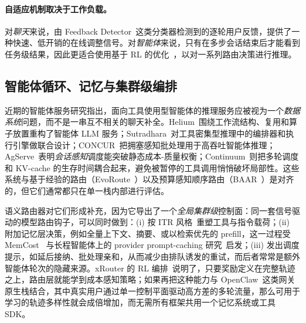 \paragraph{自适应机制取决于工作负载。}
对\emph{聊天}来说，由 Feedback Detector~\cite{feedbackdet2026}这类分类器检测到的逐轮用户反馈，提供了一种快速、低开销的在线调整信号。对\emph{智能体}来说，只有在多步会话结束后才能看到任务级结果，因此更适合使用基于 RL 的优化~\cite{routerr1_2025}，以对一系列路由决策进行推理。

\subsection{智能体循环、记忆与集群级编排}
\label{sec:router:agent-loops}

近期的智能体服务研究指出，面向工具使用型智能体的推理服务应被视为一个\emph{数据系统}问题，而不是一串互不相关的聊天补全。Helium~\cite{helium2026}围绕工作流结构、复用和算子放置重构了智能体 LLM 服务；Sutradhara~\cite{sutradhara2026}对工具密集型推理中的编排器和执行引擎做联合设计；CONCUR~\cite{concur2026}把拥塞感知批处理用于高吞吐智能体推理；AgServe~\cite{agserve2025}表明\emph{会话感知}调度能突破静态成本-质量权衡；Continuum~\cite{continuum2025}则把多轮调度和 KV-cache 的生存时间耦合起来，避免被暂停的工具调用悄悄破坏局部性。这些系统与基于经验的路由（EvoRoute~\cite{evoroute2026}）以及预算感知顺序路由（BAAR~\cite{baar2026}）是对齐的，但它们通常都只在单一栈内部进行评估。

语义路由器对它们形成补充，因为它导出了一个\emph{全局集群级}控制面：同一套信号驱动的模型路由钩子，可以同时做到：(i) 按 ITR 风格~\cite{itr2026}重塑工具与指令载荷；(ii) 附加记忆层决策，例如全量上下文、摘要、或以检索优先的 prefill，这一过程受 MemCost~\cite{memcost2026} 与长程智能体上的 provider prompt-caching 研究~\cite{dontbreakcache2026}启发；(iii) 发出调度提示，如延后接纳、批处理亲和，从而减少由排队诱发的重试，而后者常常是额外智能体轮次的隐藏来源。xRouter 的 RL 编排~\cite{xrouter2025}说明了，只要奖励定义在完整轨迹之上，路由层就能学到成本感知策略；如果再把这种能力与 OpenClaw~\cite{openclaw2026}这类网关原生栈结合，其中真实用户通过单一控制平面驱动高方差的多轮流量，那么可用于学习的轨迹多样性就会成倍增加，而无需所有框架共用一个记忆系统或工具 SDK。

